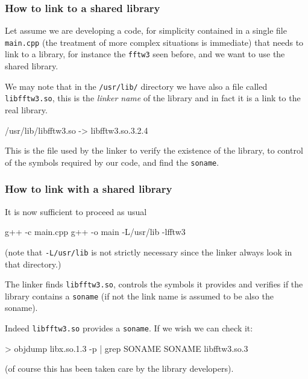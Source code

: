 \documentclass[9pt]{beamer}
\begin{document}
\begin{frame}
  \frametitle{How to link to a shared library} Let assume we are
  developing a code, for simplicity contained in a single file
  \texttt{main.cpp} (the treatment of more complex situations is
  immediate) that needs to link to a library, for instance the
  \texttt{fftw3} seen before, and we want to use the shared library.
  \smallskip

  We may note that in the \texttt{/usr/lib/} directory we have also a
  file called \texttt{libfftw3.so}, this is the \emph{linker name} of
the library and in fact it is a link to the real library.
\begin{semiverbatim}
/usr/lib/libfftw3.so -> libfftw3.so.3.2.4
\end{semiverbatim}
\medskip This is the file used by the linker to verify the existence
of the library, to control of the symbols required by our code, and
find the \texttt{soname}.
\end{frame}
\begin{frame}
  \frametitle{How to link with a shared library} 
  
It is now sufficient to proceed as usual
\begin{semiverbatim}
g++ -c main.cpp\newline
g++ -o main -L/usr/lib -lfftw3
\end{semiverbatim}
(note that \texttt{-L/usr/lib} is not strictly necessary since the
linker always look in that directory.)

The linker finds \texttt{libfftw3.so}, controls the symbols it
provides and verifies if the library \alert{contains a
  \texttt{soname}} (if not the link name is assumed to be also the
soname).

Indeed \texttt{libfftw3.so} provides a \texttt{soname}. If we wish we
can check it:
\begin{semiverbatim}
> objdump libx.so.1.3 -p | grep SONAME \newline
SONAME   libfftw3.so.3
\end{semiverbatim}
(of course this has been taken care by the library developers).
\end{frame}
\end{document}
